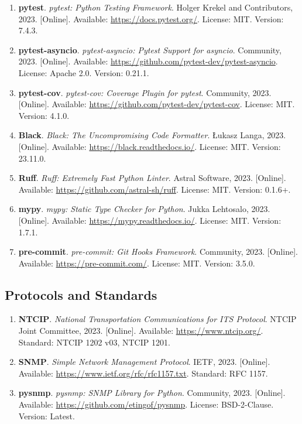 \begin{enumerate}[resume]
    \item \textbf{pytest}. \textit{pytest: Python Testing Framework}. 
    Holger Krekel and Contributors, 2023. [Online]. Available: \url{https://docs.pytest.org/}. 
    License: MIT. Version: 7.4.3.
    
    \item \textbf{pytest-asyncio}. \textit{pytest-asyncio: Pytest Support for asyncio}. 
    Community, 2023. [Online]. Available: \url{https://github.com/pytest-dev/pytest-asyncio}. 
    License: Apache 2.0. Version: 0.21.1.
    
    \item \textbf{pytest-cov}. \textit{pytest-cov: Coverage Plugin for pytest}. 
    Community, 2023. [Online]. Available: \url{https://github.com/pytest-dev/pytest-cov}. 
    License: MIT. Version: 4.1.0.
    
    \item \textbf{Black}. \textit{Black: The Uncompromising Code Formatter}. 
    Łukasz Langa, 2023. [Online]. Available: \url{https://black.readthedocs.io/}. 
    License: MIT. Version: 23.11.0.
    
    \item \textbf{Ruff}. \textit{Ruff: Extremely Fast Python Linter}. 
    Astral Software, 2023. [Online]. Available: \url{https://github.com/astral-sh/ruff}. 
    License: MIT. Version: 0.1.6+.
    
    \item \textbf{mypy}. \textit{mypy: Static Type Checker for Python}. 
    Jukka Lehtosalo, 2023. [Online]. Available: \url{https://mypy.readthedocs.io/}. 
    License: MIT. Version: 1.7.1.
    
    \item \textbf{pre-commit}. \textit{pre-commit: Git Hooks Framework}. 
    Community, 2023. [Online]. Available: \url{https://pre-commit.com/}. 
    License: MIT. Version: 3.5.0.
\end{enumerate}

\subsection*{Protocols and Standards}

\begin{enumerate}[resume]
    \item \textbf{NTCIP}. \textit{National Transportation Communications for ITS Protocol}. 
    NTCIP Joint Committee, 2023. [Online]. Available: \url{https://www.ntcip.org/}. 
    Standard: NTCIP 1202 v03, NTCIP 1201.
    
    \item \textbf{SNMP}. \textit{Simple Network Management Protocol}. 
    IETF, 2023. [Online]. Available: \url{https://www.ietf.org/rfc/rfc1157.txt}. 
    Standard: RFC 1157.
    
    \item \textbf{pysnmp}. \textit{pysnmp: SNMP Library for Python}. 
    Community, 2023. [Online]. Available: \url{https://github.com/etingof/pysnmp}. 
    License: BSD-2-Clause. Version: Latest.
\end{enumerate}

